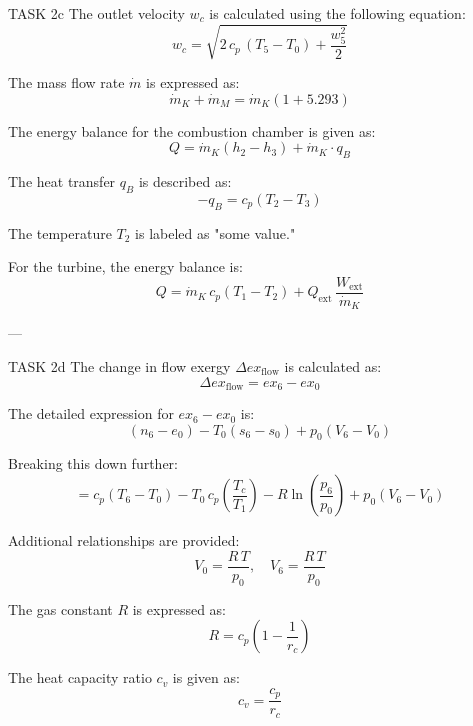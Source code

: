 TASK 2c  
The outlet velocity \( w_c \) is calculated using the following equation:  
\[
w_c = \sqrt{2 \, c_p \, (T_5 - T_0) + \frac{w_5^2}{2}}
\]

The mass flow rate \( \dot{m} \) is expressed as:  
\[
\dot{m}_K + \dot{m}_M = \dot{m}_K (1 + 5.293)
\]

The energy balance for the combustion chamber is given as:  
\[
Q = \dot{m}_K (h_2 - h_3) + \dot{m}_K \cdot q_B
\]

The heat transfer \( q_B \) is described as:  
\[
-q_B = c_p (T_2 - T_3)
\]

The temperature \( T_2 \) is labeled as "some value."

For the turbine, the energy balance is:  
\[
Q = \dot{m}_K \, c_p (T_1 - T_2) + Q_{\text{ext}} \, \frac{W_{\text{ext}}}{\dot{m}_K}
\]

---

TASK 2d  
The change in flow exergy \( \Delta ex_{\text{flow}} \) is calculated as:  
\[
\Delta ex_{\text{flow}} = ex_6 - ex_0
\]

The detailed expression for \( ex_6 - ex_0 \) is:  
\[
(n_6 - e_0) - T_0 (s_6 - s_0) + p_0 \left( V_6 - V_0 \right)
\]

Breaking this down further:  
\[
= c_p (T_6 - T_0) - T_0 \, c_p \left( \frac{T_c}{T_1} \right) - R \ln \left( \frac{p_6}{p_0} \right) + p_0 (V_6 - V_0)
\]

Additional relationships are provided:  
\[
V_0 = \frac{R \, T}{p_0}, \quad V_6 = \frac{R \, T}{p_0}
\]

The gas constant \( R \) is expressed as:  
\[
R = c_p \left( 1 - \frac{1}{r_c} \right)
\]

The heat capacity ratio \( c_v \) is given as:  
\[
c_v = \frac{c_p}{r_c}
\]